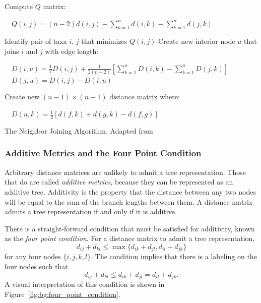 \begin{algorithm}[t]
     {
        Compute $Q$ matrix:

        $\quad Q(i,j) = (n-2)d(i,j) - \sum_{k=1}^{n}d(i,k) - \sum_{k=1}^{n}d(j,k)$\;

        Identify pair of taxa $i$, $j$ that minimizes $Q(i,j)$\;
        Create new interior node $u$ that joins $i$ and $j$ with edge length:

        $\quad D(i,u) = \frac{1}{2}D(i,j) + \frac{1}{2(n-2)}\left[\sum_{k=1}^{n}D(i,k) - \sum_{k=1}^{n}D(j,k)\right]$\;
        $\quad D(j,u) = D(i,j) - D(i,u)$\;
        
        Create new $(n-1)\times(n-1)$ distance matrix where:

        $\quad D(u,k) = \frac{1}{2}[d(f,k)+d(g,k)-d(f,g)]$\;
    }
    \caption{The Neighbor Joining Algorithm. Adapted from \cite{wiki:nj}}
    \label{bg:alg:nj}
\end{algorithm}

\subsubsection{Additive Metrics and the Four Point Condition}
\label{bg:bio:phylo:additivity}

Arbitrary distance matrices are unlikely to admit a tree representation.
Those that do are called \emph{additive metrics}, because they can be represented as an additive tree.
Additivity is the property that the distance between any two nodes will be equal to the sum of the branch lengths between them.
A distance matrix admits a tree representation if and only if it is additive.

There is a straight-forward condition that must be satisfied for additivity, known as the \emph{four point condition}.
For a distance matrix to admit a tree representation, 
\begin{equation}
d_{ij} + d_{kl} \leq \max\{d_{ik} + d_{jl} ,  d_{il} + d_{jk} \}
\end{equation}
for any four nodes $\{i,j,k,l\}$.
The condition implies that there is a labeling on the four nodes such that
\begin{equation}
d_{ij} + d_{kl} \leq d_{ik} + d_{jl} =  d_{il} + d_{jk}.
\end{equation}
A visual interpretation of this condition is shown in Figure~\ref{fig:bg:four_point_condition}.

